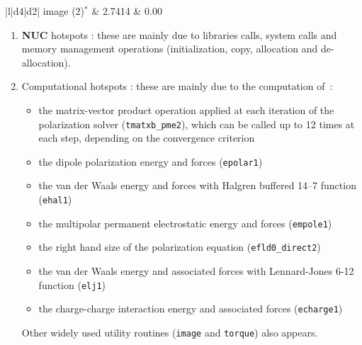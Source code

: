 \documentclass[9pt,comparison]{livecoms}
\newcommand{\lv}{\Large\verb}
\begin{document}
\begin{table}[t!]
\begin{tabular}{|l|d{4}|d{2}|}
 image (2)$^*$ &  2.7414 & 0.00\\
\hline
\end{tabular}
\caption{Profiling of \textbf{Rel} using Intel VTune Amplifier. Simulations ran on one core and 100 steps. \textbf{MS} is DHFR with AMOEBA polarizable force field and with CHARMM force field (no polarization). Most important \textbf{NUC} and computational hostspots are shown in  separate frames. \textbf{vmlinux} is the system kernel, performing memory operations and system calls. For CHARMM calculation, image is splitted in two parts. The vectorized routines will use image(2). So, only the starred lines are counted in the total CPU time for comparison with \textbf{Vec}.}
\label{table:ReleaseProfUbiDHFR}
\end{table}

\label{Hotspots}
\begin{enumerate}
\item \textbf{NUC} hotspots : these are mainly due to libraries calls, system calls and memory management operations (initialization, copy, allocation and de-allocation). 
\item Computational hotspots : these are mainly due to the computation of~:
\begin{itemize}
    \item the matrix-vector product operation applied at each iteration of the polarization solver ({\color{codepurple}\lv|tmatxb_pme2|}), which can be  called up to 12 times at each step, depending on the convergence criterion 
\item the dipole polarization energy and forces ({\color{codepurple}\lv|epolar1|})
    \item the van der Waals energy and forces with Halgren buffered 14–7 function ({\color{codepurple}\lv|ehal1|})
   \item the multipolar permanent electrostatic energy and forces ({\color{codepurple}\lv|empole1|})
    \item the right hand size of the polarization equation ({\color{codepurple}\lv|efld0_direct2|})
    \item the van der Waals energy and associated forces with Lennard-Jones 6-12 function ({\color{codepurple}\lv|elj1|})
    \item the charge-charge interaction energy and associated forces  ({\color{codepurple}\lv|echarge1|})
\end{itemize}
Other widely used utility routines ({\color{codepurple}\lv|image|} and {\color{codepurple}\lv|torque|}) also appears.  
\end{enumerate}
\end{document}
